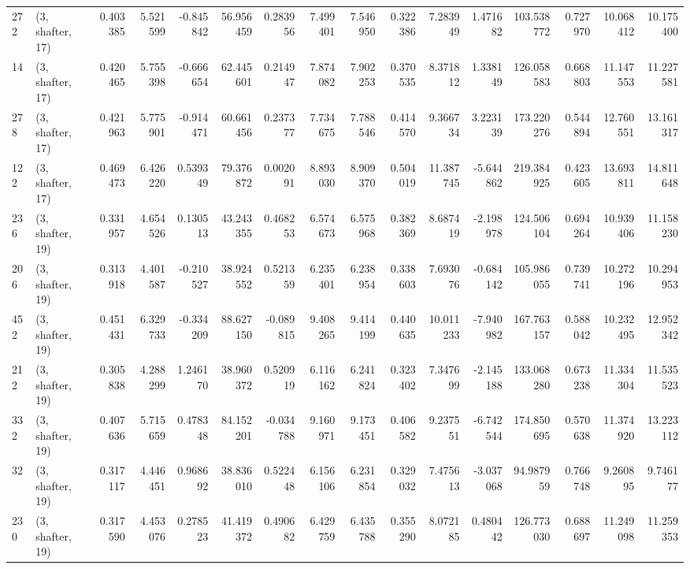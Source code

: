 \begin{tabular}{llrrrrrrrrrrrrrr}
272 &  (3, shafter, 17) &   0.403385 &   5.521599 &  -0.845842 &    56.956459 &   0.283956 &   7.499401 &   7.546950 &  0.322386 &   7.283949 &   1.471682 &   103.538772 &  0.727970 &  10.068412 &  10.175400 \\
14  &  (3, shafter, 17) &   0.420465 &   5.755398 &  -0.666654 &    62.445601 &   0.214947 &   7.874082 &   7.902253 &  0.370535 &   8.371812 &   1.338149 &   126.058583 &  0.668803 &  11.147553 &  11.227581 \\
278 &  (3, shafter, 17) &   0.421963 &   5.775901 &  -0.914471 &    60.661456 &   0.237377 &   7.734675 &   7.788546 &  0.414570 &   9.366734 &   3.223139 &   173.220276 &  0.544894 &  12.760551 &  13.161317 \\
122 &  (3, shafter, 17) &   0.469473 &   6.426220 &   0.539349 &    79.376872 &   0.002091 &   8.893030 &   8.909370 &  0.504019 &  11.387745 &  -5.644862 &   219.384925 &  0.423605 &  13.693811 &  14.811648 \\
236 &  (3, shafter, 19) &   0.331957 &   4.654526 &   0.130513 &    43.243355 &   0.468253 &   6.574673 &   6.575968 &  0.382369 &   8.687419 &  -2.198978 &   124.506104 &  0.694264 &  10.939406 &  11.158230 \\
206 &  (3, shafter, 19) &   0.313918 &   4.401587 &  -0.210527 &    38.924552 &   0.521359 &   6.235401 &   6.238954 &  0.338603 &   7.693076 &  -0.684142 &   105.986055 &  0.739741 &  10.272196 &  10.294953 \\
452 &  (3, shafter, 19) &   0.451431 &   6.329733 &  -0.334209 &    88.627150 &  -0.089815 &   9.408265 &   9.414199 &  0.440635 &  10.011233 &  -7.940982 &   167.763157 &  0.588042 &  10.232495 &  12.952342 \\
212 &  (3, shafter, 19) &   0.305838 &   4.288299 &   1.246170 &    38.960372 &   0.520919 &   6.116162 &   6.241824 &  0.323402 &   7.347699 &  -2.145188 &   133.068280 &  0.673238 &  11.334304 &  11.535523 \\
332 &  (3, shafter, 19) &   0.407636 &   5.715659 &   0.478348 &    84.152201 &  -0.034788 &   9.160971 &   9.173451 &  0.406582 &   9.237551 &  -6.742544 &   174.850695 &  0.570638 &  11.374920 &  13.223112 \\
32  &  (3, shafter, 19) &   0.317117 &   4.446451 &   0.968692 &    38.836010 &   0.522448 &   6.156106 &   6.231854 &  0.329032 &   7.475613 &  -3.037068 &    94.987959 &  0.766748 &   9.260895 &   9.746177 \\
230 &  (3, shafter, 19) &   0.317590 &   4.453076 &   0.278523 &    41.419372 &   0.490682 &   6.429759 &   6.435788 &  0.355290 &   8.072185 &   0.480442 &   126.773030 &  0.688697 &  11.249098 &  11.259353 \\

\end{tabular}
